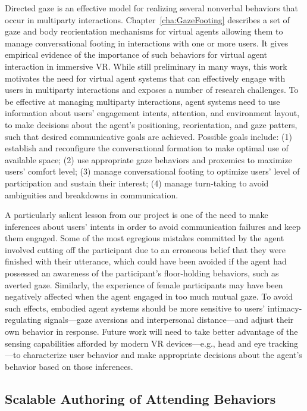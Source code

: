 Directed gaze is an effective model for realizing several nonverbal behaviors that occur in multiparty interactions. Chapter~\ref{cha:GazeFooting} describes a set of gaze and body reorientation mechanisms for virtual agents allowing them to manage conversational footing in interactions with one or more users. It gives empirical evidence of the importance of such behaviors for virtual agent interaction in immersive VR. While still preliminary in many ways, this work motivates the need for virtual agent systems that can effectively engage with users in multiparty interactions and exposes a number of research challenges. To be effective at managing multiparty interactions, agent systems need to use information about users' engagement intents, attention, and environment layout, to make decisions about the agent's positioning, reorientation, and gaze patters, such that desired communicative goals are achieved. Possible goals include: (1) establish and reconfigure the conversational formation to make optimal use of available space; (2) use appropriate gaze behaviors and proxemics to maximize users' comfort level; (3) manage conversational footing to optimize users' level of participation and sustain their interest; (4) manage turn-taking to avoid ambiguities and breakdowns in communication.

A particularly salient lesson from our project is one of the need to make inferences about users' intents in order to avoid communication failures and keep them engaged. Some of the most egregious mistakes committed by the agent involved cutting off the participant due to an erroneous belief that they were finished with their utterance, which could have been avoided if the agent had possessed an awareness of the participant's floor-holding behaviors, such as averted gaze. Similarly, the experience of female participants may have been negatively affected when the agent engaged in too much mutual gaze. To avoid such effects, embodied agent systems should be more sensitive to users' intimacy-regulating signals---gaze aversions and interpersonal distance---and adjust their own behavior in response. Future work will need to take better advantage of the sensing capabilities afforded by modern VR devices---e.g., head and eye tracking---to characterize user behavior and make appropriate decisions about the agent's behavior based on those inferences.

\subsection{Scalable Authoring of Attending Behaviors}


